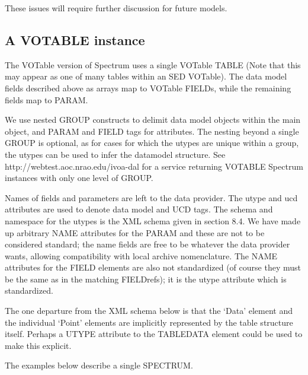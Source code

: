These issues will require further discussion for future models.

\subsection{A VOTABLE instance}

The VOTable version of Spectrum uses a single VOTable {\lcaret}TABLE{\rcaret}
(Note that this may appear as one of many tables within an SED VOTable).
The data model fields described above as arrays map to
VOTable FIELDs, while the remaining fields map to PARAM.

We use nested GROUP constructs to delimit data model objects within the
main object, and PARAM and FIELD tags for attributes.
The nesting beyond a single GROUP is optional, as for cases for which
the utypes are unique within a group, the utypes can be used to infer
the datamodel structure. See
http://webtest.aoc.nrao.edu/ivoa-dal for a service returning VOTABLE
Spectrum instances with only one level of GROUP.

Names of fields and parameters are left to the data provider.
The utype and ucd attributes are used to denote data model and UCD tags.
The schema and namespace for the utypes is the XML schema given in section 8.4.
We have made up arbitrary NAME attributes for the PARAM and these
are not to be considered standard; the name fields are free
to be whatever the data provider wants, allowing compatibility with
local archive nomenclature. The NAME attributes for the FIELD elements
are also not standardized (of course they must be the same as in the
matching FIELDrefs); it is the utype attribute which is standardized.

The one departure from the XML schema below is that the `Data'
element and the individual `Point' elements are implicitly represented
by the table structure itself. Perhaps a UTYPE attribute to the
TABLEDATA element could be used to make this explicit.

The examples below describe a single SPECTRUM.



